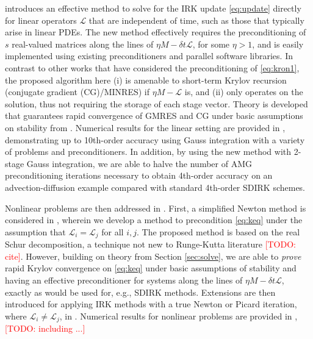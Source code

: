 \documentclass[review]{siamart}
\makeatletter
\newcommand{\todo}[1]{\textcolor{red}{[TODO\@: #1]}}
\makeatother
\begin{document}
 introduces an effective method to solve for the IRK update
\eqref{eq:update} directly for linear operators $\mathcal{L}$ that are independent of time,
such as those that typically arise in linear PDEs. The new method effectively
requires the preconditioning of $s$ real-valued matrices along the lines of
$\eta M - \delta t\mathcal{L}$, for some $\eta > 1$, and is easily implemented
using existing preconditioners and parallel software libraries. 
In contrast to other works that have considered the preconditioning of \eqref{eq:kron1},
the proposed algorithm here (i) is amenable to short-term Krylov recursion (conjugate
gradient (CG)/MINRES) if $\eta M - \mathcal{L}$ is, and (ii) only operates on the solution,
thus not requiring the storage of each stage vector. Theory is developed
that guarantees rapid convergence of GMRES and CG under basic assumptions
on stability from . Numerical results for the
linear setting are provided in , demonstrating
up to 10th-order accuracy using Gauss integration with a variety of problems
and preconditioners. In addition, by using the new method with 2-stage Gauss
integration, we are able to halve the number of AMG preconditioning iterations
necessary to obtain 4th-order accuracy on an advection-diffusion example
compared with standard 4th-order SDIRK schemes.

Nonlinear problems are then addressed in . First, a
simplified Newton method is considered in ,
wherein we develop a method to precondition
\eqref{eq:keq} under the assumption that $\mathcal{L}_i=\mathcal{L}_j$ for all
$i,j$. The proposed method is based on the real Schur decomposition, a technique
not new to Runge-Kutta literature \todo{cite}. However, building on theory from
Section \ref{sec:solve}, we are able to \textit{prove} rapid Krylov convergence
on \eqref{eq:keq}
under basic assumptions of stability and having an effective preconditioner for
systems along the lines of $\eta M - \delta t\mathcal{L}$, exactly as would be
used for, e.g., SDIRK methods. Extensions are then introduced for applying IRK
methods with a true Newton or Picard iteration, where $\mathcal{L}_i\neq
\mathcal{L}_j$, in . Numerical results for nonlinear
problems are provided in , \todo{including ...}


\end{document}
